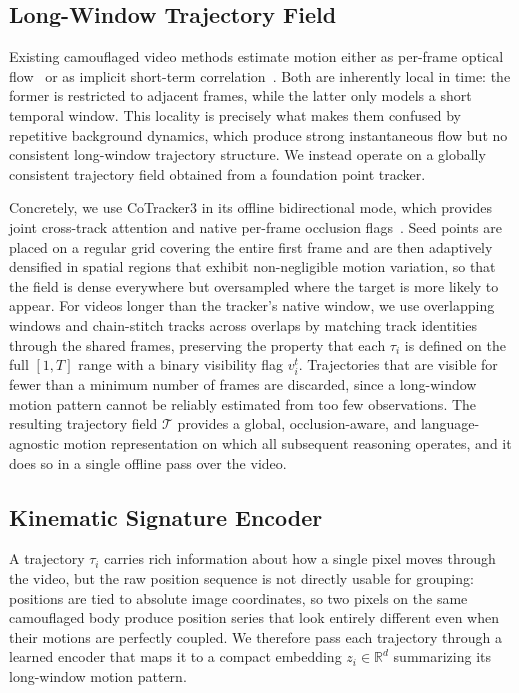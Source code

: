 \documentclass[11pt]{article}
\begin{document}
\subsection{Long-Window Trajectory Field}

Existing camouflaged video methods estimate motion either as per-frame optical flow~\cite{emip} or as implicit short-term correlation~\cite{sltnet}.
Both are inherently local in time: the former is restricted to adjacent frames, while the latter only models a short temporal window.
This locality is precisely what makes them confused by repetitive background dynamics, which produce strong instantaneous flow but no consistent long-window trajectory structure.
We instead operate on a globally consistent trajectory field obtained from a foundation point tracker.

Concretely, we use CoTracker3 in its offline bidirectional mode, which provides joint cross-track attention and native per-frame occlusion flags~\cite{cotracker3}.
Seed points are placed on a regular grid covering the entire first frame and are then adaptively densified in spatial regions that exhibit non-negligible motion variation, so that the field is dense everywhere but oversampled where the target is more likely to appear.
For videos longer than the tracker's native window, we use overlapping windows and chain-stitch tracks across overlaps by matching track identities through the shared frames, preserving the property that each $\tau_i$ is defined on the full $[1,T]$ range with a binary visibility flag $v_i^t$.
Trajectories that are visible for fewer than a minimum number of frames are discarded, since a long-window motion pattern cannot be reliably estimated from too few observations.
The resulting trajectory field $\mathcal{T}$ provides a global, occlusion-aware, and language-agnostic motion representation on which all subsequent reasoning operates, and it does so in a single offline pass over the video.

\subsection{Kinematic Signature Encoder}

A trajectory $\tau_i$ carries rich information about how a single pixel moves through the video, but the raw position sequence is not directly usable for grouping: positions are tied to absolute image coordinates, so two pixels on the same camouflaged body produce position series that look entirely different even when their motions are perfectly coupled.
We therefore pass each trajectory through a learned encoder that maps it to a compact embedding $z_i\in\mathbb{R}^d$ summarizing its long-window motion pattern.
\end{document}
